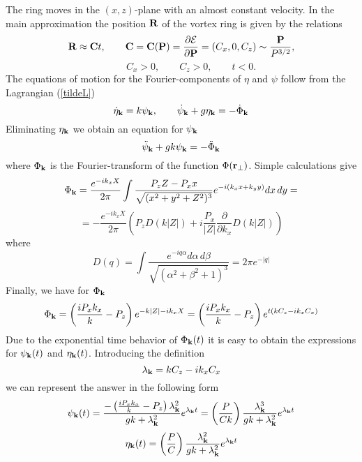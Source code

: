 The ring moves in the $(x,z)$-plane with an
almost constant velocity. In the main approximation the position 
${\bf R}$ of the vortex ring is given by the relations
\begin{equation}
{\bf R}\approx{\bf C}t,\qquad 
{\bf C}={\bf C}({\bf P})=
\frac{\partial{\cal E}}{\partial{\bf P}}=(C_x,0,C_z)\sim\frac{\bf P}{P^{3/2}},
\end{equation}
$$
\qquad C_x>0,\qquad C_z>0,\qquad t<0.
$$
The equations of motion for the Fourier-components of $\eta$ and $\psi$ follow
from the Lagrangian (\ref{tildeL})
\begin{equation}
\dot\eta_{\bf k}=k\psi_{\bf k},\qquad
\dot\psi_{\bf k}+g\eta_{\bf k}=-\dot\Phi_{\bf k}
\end{equation}
Eliminating $\eta_{\bf k}$ we obtain an equation for $\psi_{\bf k}$
\begin{equation}
\ddot\psi_{\bf k}+gk\psi_{\bf k}=-\ddot\Phi_{\bf k}
\end{equation}
where $\Phi_{\bf k}$ is the Fourier-transform of the  function 
$\Phi({\bf r}_\bot)$. Simple calculations give
$$
\Phi_{\bf k}=\frac{e^{-ik_x X}}{2\pi}\int
\frac{P_z Z-P_x x}{\sqrt{(x^2+y^2+Z^2)^3}}
e^{-i(k_x x+k_y y)}dx\,dy=
$$
\begin{equation}
=-\frac{e^{-ik_x X}}{2\pi}
\left(P_zD(k|Z|)+i\frac{P_x}{|Z|}\frac{\partial}{\partial k_x}D(k|Z|)
\right)
\end{equation}
where
\begin{equation}
D(q)=\int\frac{e^{-iq\alpha}d\alpha\,d\beta}
{\sqrt{(\alpha^2+\beta^2+1)^3}}=2\pi e^{-|q|}
\end{equation}
Finally, we have for $\Phi_{\bf k}$
\begin{equation}\label{Phi_k}
\Phi_{\bf k}=\left(\frac{iP_xk_x}{k}-P_z\right)e^{-k|Z|-ik_xX}=
\left(\frac{iP_xk_x}{k}-P_z\right)e^{t(kC_z-ik_xC_x)}
\end{equation}
Due to the exponential time behavior of $\Phi_{\bf k}(t)$ 
it is easy to obtain the expressions for 
$\psi_{\bf k}(t)$ and  $\eta_{\bf k}(t)$. Introducing the definition
\begin{equation}
\lambda_{\bf k}=kC_z-ik_xC_x
\end{equation}
we can represent the answer in the following form
\begin{equation}
\psi_{\bf k}(t)=\frac{-\left(\frac{iP_xk_x}{k}-P_z\right)\lambda_{\bf k}^2}
{gk+\lambda_{\bf k}^2}e^{\lambda_{\bf k}t}
=\left(\frac{P}{Ck}\right)\frac{\lambda_{\bf k}^3}
{gk+\lambda_{\bf k}^2}e^{\lambda_{\bf k}t}
\end{equation}
\begin{equation}\label{eta_kt}
\eta_{\bf k}(t)=\left(\frac{P}{C}\right)\frac{\lambda_{\bf k}^2}
{gk+\lambda_{\bf k}^2}e^{\lambda_{\bf k}t}
\end{equation}

